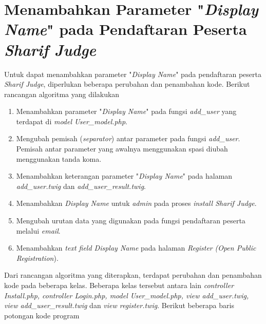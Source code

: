 \section{Menambahkan Parameter "\textit{Display Name}" pada Pendaftaran Peserta \textit{Sharif Judge}}
Untuk dapat menambahkan parameter "\textit{Display Name}" pada pendaftaran peserta \textit{Sharif Judge}, diperlukan beberapa perubahan dan penambahan kode. Berikut rancangan algoritma yang dilakukan
\begin{enumerate}
	\item Menambahkan parameter "\textit{Display Name}" pada fungsi \textit{add\_user} yang terdapat di \textit{model User\_model.php}.
	\item Mengubah pemisah (\textit{separator}) antar parameter pada fungsi \textit{add\_user}. Pemisah antar parameter yang awalnya menggunakan spasi diubah menggunakan tanda koma.
	\item Menambahkan keterangan parameter "\textit{Display Name}" pada halaman \textit{add\_user.twig} dan  \textit{add\_user\_result.twig}.
	\item Menambahkan \textit{Display Name} untuk \textit{admin} pada proses \textit{install Sharif Judge}.
	\item Mengubah urutan data yang digunakan pada fungsi pendaftaran peserta melalui \textit{email}.
	\item Menambahkan \textit{text field Display Name} pada halaman \textit{Register} \textit{(Open Public Registration}).
\end{enumerate}
Dari rancangan algoritma yang diterapkan, terdapat perubahan dan penambahan kode pada beberapa kelas. Beberapa kelas tersebut antara lain \textit{controller Install.php, controller Login.php, model User\_model.php, view add\_user.twig, view add\_user\_result.twig} dan \textit{view register.twig}.
Berikut beberapa baris potongan kode program

